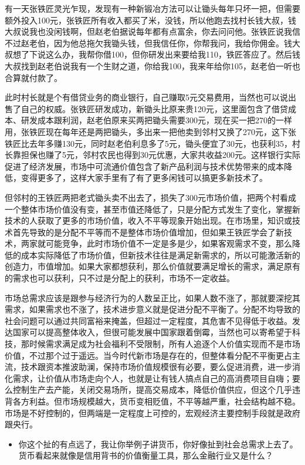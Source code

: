 \documentclass[
  letterpaper,
  DIV=11,
  numbers=noendperiod]{scrreprt}
\providecommand{\tightlist}{%
  \setlength{\itemsep}{0pt}\setlength{\parskip}{0pt}}\usepackage{longtable,booktabs,array}
\begin{document}
有一天张铁匠灵光乍现，发现有一种新锻冶方法可以让锄头每年只坏一把，但需要额外投入100元，张铁匠所有收入都买了米，没钱，所以他跑去找村长钱大叔，钱大叔说我也没闲钱啊，但赵老伯据说每年都有点富余，你去问问他。张铁匠说我信不过赵老伯，因为他总拖欠我锄头钱，但我信任你，你帮我问，我给你佣金。钱大叔想了下说这么办，我帮你借100，但你研发出来要给我110，铁匠答应了。然后钱大叔找到赵老伯说我有一个生财之道，你给我100，我来年给你105，赵老伯一听也合算就付款了。

此时村长就是个有借贷业务的商业银行，自己赚取5元交易费用，当然也可以说出售了自己的权威。张铁匠研发成功，新锄头比原来贵120元，这里面包含了借贷成本、研发成本跟利润，赵老伯原来买两把锄头需要300元，现在买一把270的一样用，张铁匠现在每年还是两把锄头，多出来一把他卖到邻村又换了270元，这下张铁匠比去年多赚130元，同时赵老伯利息多了5元，锄头便宜了30元，也获利35，村长靠担保也赚了5元，邻村农民也得到30元优惠，大家共收益200元。这样银行实际促进了经济发展，市场中可流通价值包含了新产品利润与技术优势带来的成本降低，变得更多了，这样大家手里有了有了更多闲钱可以搞更多新技术了。

但邻村的王铁匠两把老式锄头卖不出去了，损失了300元市场价值，把两个村看成一个整体市场价值没有变，甚至市值还降低了，只是分配方式发生了变化，掌握新技术的人获取了更多的市场价值，收入不平等现象开始出现。在市场里，知识或技术首先导致的是分配不平等而不是整体市场价值增加，但如果王铁匠学会了新技术，两家就可能竞争，此时市场价值不一定是多是少，如果客观需求不变，那么降低的成本实际降低了市场价值，但新技术往往是满足新需求的，所以可能激活新的创造力，市值增加。如果大家都想获利，那么价值就要满足增长的需求，满足原有的需求也可以获利，只不过是分配上的获利，市场不一定收益。

市场总需求应该是跟参与经济行为的人数呈正比，如果人数不涨了，那就要深挖其需求，如果需求也不涨了，技术进步意义就是促进分配不平衡了。分配不均导致的社会问题可以通过共同富裕来掩盖，但超过一定程度，其危害不见得低于收益。发达国家可以提高整体收入，但很可能发展中国家跟着倒霉，当然也可以寄希望于科技，那时候需求满足成为社会福利不受限制，所有人追逐个人价值实现而不是市场价值，不过那个过于遥远。当今时代新市场是存在的，但整体看分配不平衡更占主流，技术跟资本推波助澜，保持市场价值规模很有必要，要么促进消费，进一步消化需求，让价值从市场走向个人，也就是让有钱人搞点自己的高消费项目自嗨；要么控制生产去产能，关闭交易场所，提高交易成本，降低价值供应，但这个几乎违背各方利益。但市场规模越大，货币变相贬值，不平等越严重，社会结构越不稳。市场是不好控制的，但两端是一定程度上可控的，宏观经济主要控制手段就是政府跟央行。

\begin{itemize}
\tightlist
\item
  你这个扯的有点远了，我让你举例子讲货币，你好像扯到社会总需求上去了。货币看起来就像是信用背书的价值衡量工具，那么金融行业又是什么？
\end{itemize}
\end{document}
